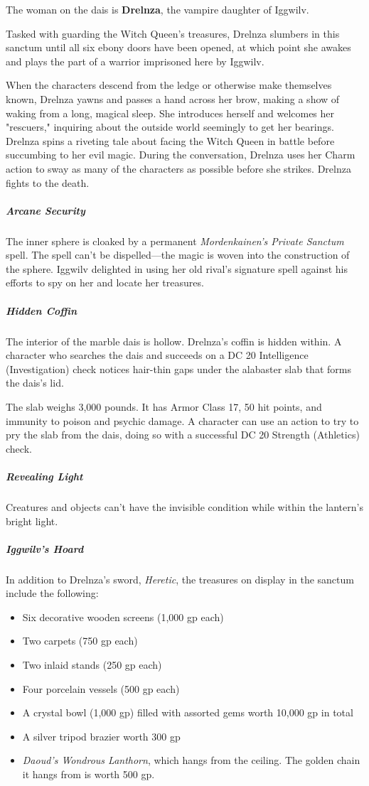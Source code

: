 \documentclass[10pt,a4paper,twoside,bg=print,twocolumn,openany,nodeprecatedcode]{dndbook}
\begin{document}
The woman on the dais is \textbf{Drelnza}, the vampire daughter of Iggwilv.

Tasked with guarding the Witch Queen's treasures, Drelnza slumbers in this sanctum until all six ebony doors have been opened, at which point she awakes and plays the part of a warrior imprisoned here by Iggwilv.

When the characters descend from the ledge or otherwise make themselves known, Drelnza yawns and passes a hand across her brow, making a show of waking from a long, magical sleep. She introduces herself and welcomes her "rescuers," inquiring about the outside world seemingly to get her bearings. Drelnza spins a riveting tale about facing the Witch Queen in battle before succumbing to her evil magic. During the conversation, Drelnza uses her Charm action to sway as many of the characters as possible before she strikes. Drelnza fights to the death.

\subparagraph{Arcane Security}
The inner sphere is cloaked by a permanent \textit{Mordenkainen's Private Sanctum} spell. The spell can't be dispelled—the magic is woven into the construction of the sphere. Iggwilv delighted in using her old rival's signature spell against his efforts to spy on her and locate her treasures.

\subparagraph{Hidden Coffin}
The interior of the marble dais is hollow. Drelnza's coffin is hidden within. A character who searches the dais and succeeds on a DC 20 Intelligence (Investigation) check notices hair-thin gaps under the alabaster slab that forms the dais's lid.

The slab weighs 3,000 pounds. It has Armor Class 17, 50 hit points, and immunity to poison and psychic damage. A character can use an action to try to pry the slab from the dais, doing so with a successful DC 20 Strength (Athletics) check.

\subparagraph{Revealing Light}
Creatures and objects can't have the invisible condition while within the lantern's bright light.

\subparagraph{Iggwilv's Hoard}
In addition to Drelnza's sword, \textit{Heretic}, the treasures on display in the sanctum include the following:


\begin{itemize}
\item Six decorative wooden screens (1,000 gp each)
\item Two carpets (750 gp each)
\item Two inlaid stands (250 gp each)
\item Four porcelain vessels (500 gp each)
\item A crystal bowl (1,000 gp) filled with assorted gems worth 10,000 gp in total
\item A silver tripod brazier worth 300 gp
\item \textit{Daoud's Wondrous Lanthorn}, which hangs from the ceiling. The golden chain it hangs from is worth 500 gp.
\end{itemize}
\end{document}
